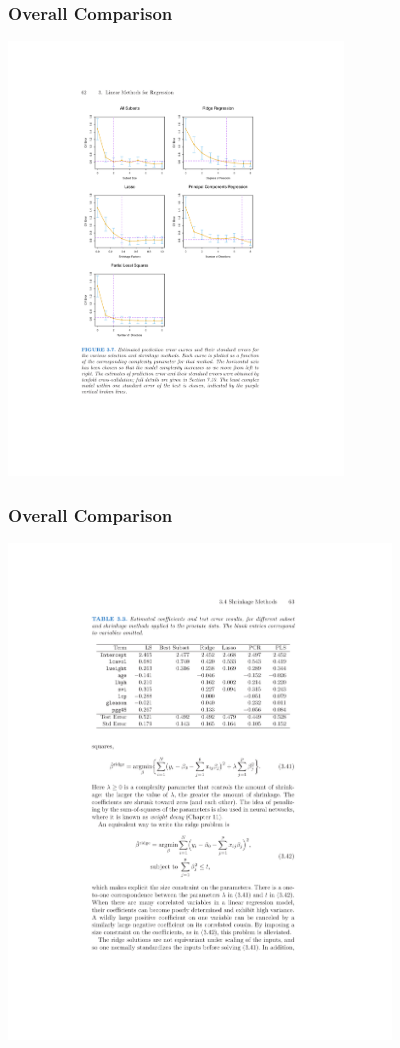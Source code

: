 \documentclass[xcolor=pdftex,dvipsnames,table,mathserif]{beamer}
\begin{document}
\begin{frame}
\frametitle{Overall Comparison}
\begin{center}
\includegraphics[width=3.5in]{./resources/comparisons}
\end{center}
\end{frame}

\begin{frame}
\frametitle{Overall Comparison}
\begin{center}
\includegraphics[width=4in]{./resources/regressiontable}
\end{center}
\end{frame}
\end{document}
